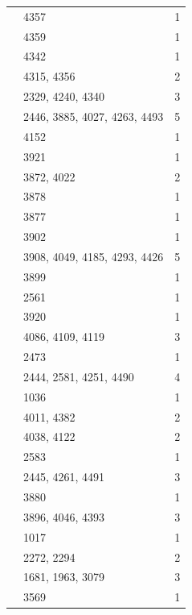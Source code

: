 \begin{longtable}{@{}p{}p{}p{}@{}}
\cite[7.4]{Taylor2014Maximal} & 4357 & 1 \\
\cite[Definition~2.7]{Taylor2014Maximal} & 4359 & 1 \\
\cite[Proposition~10.2]{Taylor2014Maximal} & 4342 & 1 \\
\cite[Theorem~2.11]{Taylor2014Maximal} & 4315, 4356 & 2 \\
\cite[p.~476]{Taylor2014Maximal} & 2329, 4240, 4340 & 3 \\
\cite[(11.15)]{Taylor2016} & 2446, 3885, 4027, 4263, 4493 & 5 \\
\cite[(11.15), Lemma~14.15 and
Proposition~15.4]{Taylor2016} & 4152 & 1 \\
\cite[10.1]{Taylor2016} & 3921 & 1 \\
\cite[10.1--10.8]{Taylor2016} & 3872, 4022 & 2 \\
\cite[10.8]{Taylor2016} & 3878 & 1 \\
\cite[11.12]{Taylor2016} & 3877 & 1 \\
\cite[6.2]{Taylor2016} & 3902 & 1 \\
\cite[Corollary~13.6]{Taylor2016} & 3908, 4049, 4185, 4293, 4426 & 5 \\
\cite[Definition~6.1 and Lemma~6.3(i)]{Taylor2016} & 3899 & 1 \\
\cite[Lemmas~14.12 and~14.15]{Taylor2016} & 2561 & 1 \\
\cite[Lemma~10.9, (10.11), Theorem~10.14 and (10.20)]{Taylor2016} & 3920 & 1 \\
\cite[Lemma~11.3]{Taylor2016} & 4086, 4109, 4119 & 3 \\
\cite[Lemma~14.12]{Taylor2016} & 2473 & 1 \\
\cite[Lemma~14.15]{Taylor2016} & 2444, 2581, 4251, 4490 & 4 \\
\cite[Lemma~14.15 and Proposition~15.2]{Taylor2016} & 1036 & 1 \\
\cite[Lemma~6.3(i)]{Taylor2016} & 4011, 4382 & 2 \\
\cite[Proposition~11.5]{Taylor2016} & 4038, 4122 & 2 \\
\cite[Proposition~15.2]{Taylor2016} & 2583 & 1 \\
\cite[Proposition~15.4]{Taylor2016} & 2445, 4261, 4491 & 3 \\
\cite[Proposition~4.6 and Section~5]{Taylor2016} & 3880 & 1 \\
\cite[Theorem~11.13 and Lemma~11.16]{Taylor2016} & 3896, 4046, 4393 & 3 \\
\cite[proof of Lemma~14.12]{Taylor2016} & 1017 & 1 \\
\cite[Proposition~11.10]{Taylor2018Automorphisms} & 2272, 2294 & 2 \\
\cite[Proposition~7.2]{Taylor2018Automorphisms} & 1681, 1963, 3079 & 3 \\
\cite{AtlasRep2026} & 3569 & 1 \\
\end{longtable}
\normalsize
